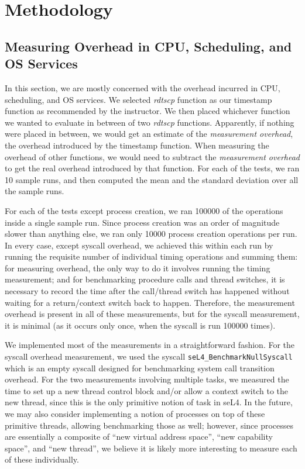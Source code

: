 \section{Methodology}
\subsection{Measuring Overhead in CPU, Scheduling, and OS Services}
%
In this section, we are mostly concerned with the overhead incurred in
CPU, scheduling, and OS services.
%
We selected \textit{rdtscp} function as our timestamp function as
recommended by the instructor.
%
We then placed whichever function we wanted to evaluate in between of two \textit{rdtscp} functions.
%
Apparently, if nothing were placed in between, we would get an estimate of the \textit{measurement overhead}, 
the overhead introduced by the timestamp function.
%
When measuring the overhead of other functions, we would need to
subtract the \textit{measurement overhead} to get the real overhead
introduced by that function.
%
For each of the tests, we ran 10 sample runs, and then computed the
mean and the standard deviation over all the sample runs.
%

For each of the tests except process creation, we ran 100000 of the
operations inside a single sample run.
%
Since process creation was an order of magnitude slower than anything
else, we ran only 10000 process creation operations per run.
%
In every case, except syscall overhead, we achieved this within each
run by running the requisite number of individual timing operations
and summing them: for measuring overhead, the only way to do it
involves running the timing measurement; and for benchmarking
procedure calls and thread switches, it is necessary to record the
time after the call/thread switch has happened without waiting for a
return/context switch back to happen.
%
Therefore, the measurement overhead is present in all of these
measurements, but for the syscall measurement, it is minimal (as it
occurs only once, when the syscall is run 100000 times).

We implemented most of the measurements in a straightforward fashion.
%
For the syscall overhead measurement, we used the syscall
\verb|seL4_BenchmarkNullSyscall| which is an empty syscall designed
for benchmarking system call transition overhead.
%
For the two measurements involving multiple tasks, we measured the
time to set up a new thread control block and/or allow a context
switch to the new thread, since this is the only primitive notion of
task in seL4.
%
In the future, we may also consider implementing a notion of processes
on top of these primitive threads, allowing benchmarking those as
well; however, since processes are essentially a composite of ``new
virtual address space'', ``new capability space'', and ``new thread'',
we believe it is likely more interesting to measure each of these
individually.
